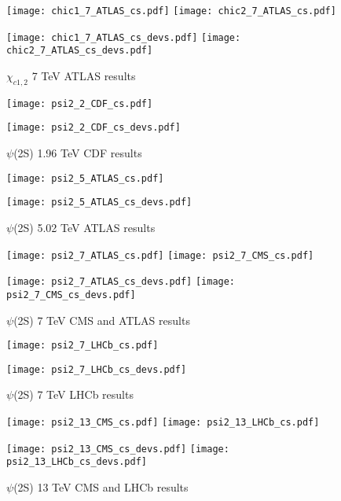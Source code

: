 \documentclass{article}
\begin{document}
\clearpage

\begin{figure}
\centering
\texttt{[image: chic1\_7\_ATLAS\_cs.pdf]}
\texttt{[image: chic2\_7\_ATLAS\_cs.pdf]}

\texttt{[image: chic1\_7\_ATLAS\_cs\_devs.pdf]}
\texttt{[image: chic2\_7\_ATLAS\_cs\_devs.pdf]}
\caption{$\chi_{c1,2}$ 7 TeV ATLAS results}
\end{figure}

\clearpage

\begin{figure}
\centering
\texttt{[image: psi2\_2\_CDF\_cs.pdf]}

\texttt{[image: psi2\_2\_CDF\_cs\_devs.pdf]}
\caption{$\psi$(2S) 1.96 TeV CDF results}
\end{figure}

\clearpage

\begin{figure}
\centering
\texttt{[image: psi2\_5\_ATLAS\_cs.pdf]}

\texttt{[image: psi2\_5\_ATLAS\_cs\_devs.pdf]}
\caption{$\psi$(2S) 5.02 TeV ATLAS results}
\end{figure}

\clearpage

\begin{figure}
\centering
\texttt{[image: psi2\_7\_ATLAS\_cs.pdf]}
\texttt{[image: psi2\_7\_CMS\_cs.pdf]}

\texttt{[image: psi2\_7\_ATLAS\_cs\_devs.pdf]}
\texttt{[image: psi2\_7\_CMS\_cs\_devs.pdf]}
\caption{$\psi$(2S) 7 TeV CMS and ATLAS results}
\end{figure}

\clearpage

\begin{figure}
\centering
\texttt{[image: psi2\_7\_LHCb\_cs.pdf]}

\texttt{[image: psi2\_7\_LHCb\_cs\_devs.pdf]}
\caption{$\psi$(2S) 7 TeV LHCb results}
\end{figure}

\clearpage

\begin{figure}
\centering
\texttt{[image: psi2\_13\_CMS\_cs.pdf]}
\texttt{[image: psi2\_13\_LHCb\_cs.pdf]}

\texttt{[image: psi2\_13\_CMS\_cs\_devs.pdf]}
\texttt{[image: psi2\_13\_LHCb\_cs\_devs.pdf]}
\caption{$\psi$(2S) 13 TeV CMS and LHCb results}
\end{figure}
\end{document}
